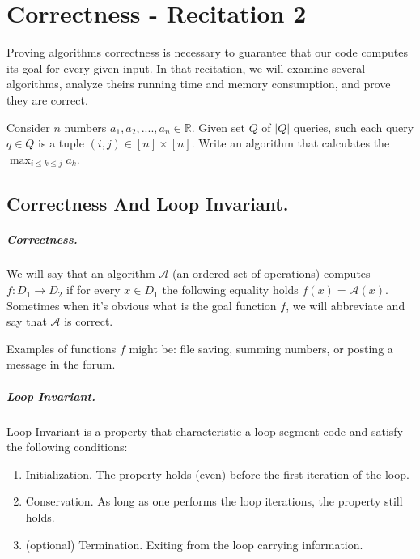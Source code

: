 
    
\chapter{Correctness - Recitation 2} 
    Proving algorithms correctness is necessary to guarantee that our code computes its goal for every given input. In that recitation, we will examine several algorithms, analyze theirs running time and memory consumption, and prove they are correct.   


\begin{example}
Consider \(n\) numbers \(a_1,a_2,....,a_n \in \mathbb{R}\). Given set \(Q\) of \(|Q|\) queries, such each query \(q \in Q\) is a tuple \( (i,j) \in [n] \times [n] \). Write an algorithm that calculates the \(\max_{i\le k\le j}{a_k} \). 
\end{example}
\section{Correctness And Loop Invariant.}

\paragraph{Correctness.} We will say that an algorithm \( \mathcal{A}\) (an ordered set of operations) computes \( f:D_1 \rightarrow D_2 \) if for every \(x \in D_1\) the following equality holds \(f(x) = \mathcal{A}(x)\). Sometimes when it's obvious what is the goal function \(f\), we will abbreviate and say that \( \mathcal{A}\) is correct.       

Examples of functions \(f\) might be: file saving, summing numbers, or posting a message in the forum.  

\paragraph{Loop Invariant.} Loop Invariant is a property that characteristic a loop segment code  and satisfy the following conditions: 
\begin{enumerate}
    \item Initialization. The property holds (even) before the first iteration of the loop.   
    \item Conservation. As long as one performs the loop iterations, the property still holds.
    \item (optional) Termination. Exiting from the loop carrying information.
\end{enumerate}

